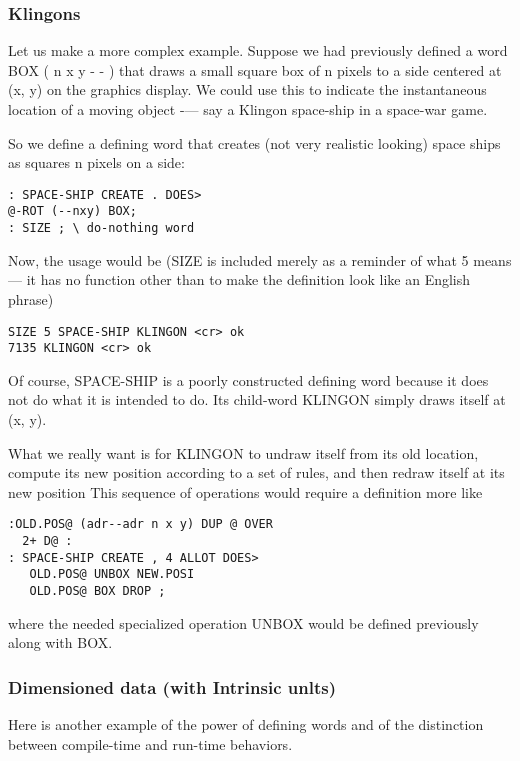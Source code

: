 \subsubsection{Klingons}
Let us make a more complex example. Suppose we had previously defined a word BOX ( n x y - - ) that draws a small square box of n pixels to a side centered at (x, y) on the graphics display. We could use this to indicate the instantaneous location of a moving object -— say a Klingon space-ship in a space-war game.

So we define a defining word that creates (not very realistic looking) space ships as squares n pixels on a side:

\begin{lstlisting}
: SPACE-SHIP CREATE . DOES>
@-ROT (--nxy) BOX;
: SIZE ; \ do-nothing word
\end{lstlisting}

Now, the usage would be (SIZE is included merely as a reminder of what 5 means — it has no function other than to make the definition look like an English phrase)

\begin{lstlisting}
SIZE 5 SPACE-SHIP KLINGON <cr> ok
7135 KLINGON <cr> ok
\end{lstlisting}

Of course, SPACE-SHIP is a poorly constructed defining word because it does not do what it is intended to do. Its child-word KLINGON simply draws itself at (x, y).

What we really want is for KLINGON to undraw itself from its old location, compute its new position according to a set of rules, and then redraw itself at its new position This sequence of operations would require a definition more like

\begin{lstlisting}
:OLD.POS@ (adr--adr n x y) DUP @ OVER
  2+ D@ :
: SPACE-SHIP CREATE , 4 ALLOT DOES>
   OLD.POS@ UNBOX NEW.POSI
   OLD.POS@ BOX DROP ;
\end{lstlisting}

where the needed specialized operation UNBOX would be defined previously along with BOX.

\subsubsection{Dimensioned data (with Intrinsic unlts)}
Here is another example of the power of defining words and of the distinction between compile-time and run-time behaviors.


